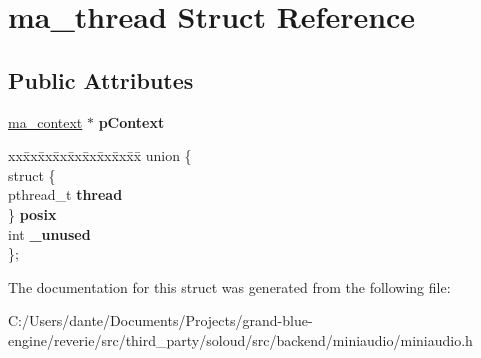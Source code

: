 \hypertarget{structma__thread}{}\section{ma\+\_\+thread Struct Reference}
\label{structma__thread}
\subsection*{Public Attributes}
\begin{DoxyCompactItemize}
\item 
\mbox{\label{structma__thread_a9c17ab4c3fc72546d6380e37701c31a6}} 
\mbox{\hyperlink{structma__context}{ma\+\_\+context}} $\ast$ {\bfseries p\+Context}
\item 
\mbox{\label{structma__thread_a117ea151e317f42d3d50ee2365542168}} 
\begin{tabbing}
xx\=xx\=xx\=xx\=xx\=xx\=xx\=xx\=xx\=\kill
union \{\\
\>struct \{\\
\>\>pthread\_t {\bfseries thread}\\
\>\} {\bfseries posix}\\
\>int {\bfseries \_unused}\\
\}; \\

\end{tabbing}\end{DoxyCompactItemize}


The documentation for this struct was generated from the following file\+:\begin{DoxyCompactItemize}
\item 
C\+:/\+Users/dante/\+Documents/\+Projects/grand-\/blue-\/engine/reverie/src/third\+\_\+party/soloud/src/backend/miniaudio/miniaudio.\+h\end{DoxyCompactItemize}
